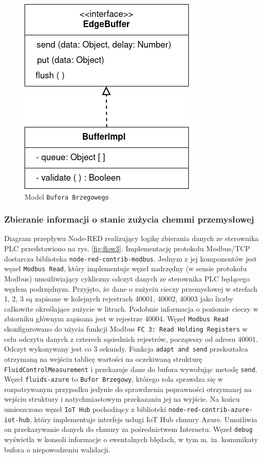 \documentclass[a4paper, 12pt, twoside]{article}
\begin{document}
\begin{figure}
      \centering
      \includegraphics[scale=0.45]{edge_buffer.png}
      \caption{Model \texttt{Bufora Brzegowego}}
      \label{fig:edge-buffer}
\end{figure}

\subsubsection{Zbieranie informacji o stanie zużycia chemmi przemysłowej }

Diagram przepływu Node-RED realizujący logikę zbierania danych ze sterownika
PLC przedstawiono na rys. \ref{fig:flow3}. Implementację protokołu
Modbus/TCP dostarcza biblioteka \texttt{node-red-contrib-modbus}.
Jednym z jej komponentów jest węzeł \texttt{Modbus Read}, który implementuje
węzeł nadrzędny (w sensie protokołu Modbus) umożliwiający cykliczny odczyt
danych ze sterownika PLC będącego węzłem podrzędnym. Przyjęto, że dane
o zużyciu cieczy przemysłowej w strefach 1, 2, 3 są zapisane w kolejnych rejestrach
40001, 40002, 40003 jako liczby całkowite określające zużycie w litrach.
Podobnie informacja o poziomie cieczy w zbiorniku głównym zapisana jest w rejestrze 40004.
Węzeł \texttt{Modbus Read} skonfigurowano do użycia funkcji Modbus
\texttt{FC 3: Read Holding Registers} w celu odczytu danych z czterech sąsiednich
rejestrów, począwszy od adresu 40001. Odczyt wykonywany jest co 3 sekundy.
Funkcja \texttt{adapt and send} przekształca otrzymaną na wejściu tablicę
wartości na oczekiwaną strukturę \texttt{FluidControlMeasurement}
i przekazuje dane do bufora wywołując metodę \texttt{send}.
Węzeł \texttt{fluids-azure} to \texttt{Bufor Brzegowy}, którego rola sprawdza się
w rozpatrywanym przypadku jedynie do sprawdzenia poprawności otrzymanej na
wejściu struktury i natychmiastowym przekazaniu jej na wyjście. Na końcu
umieszczono węzeł \texttt{IoT Hub} pochodzący z biblioteki \texttt{node-red-contrib-azure-iot-hub},
który implementuje interfejs usługi IoT Hub chmury Azure. Umożliwia on przekazywanie
danych do chmury za pośrednictwem Internetu.
Węzeł \texttt{debug} wyświetla w konsoli informacje o ewentalnych błędach, w
tym m. in. komunikaty bufora o niepowodzeniu walidacji.
\end{document}
